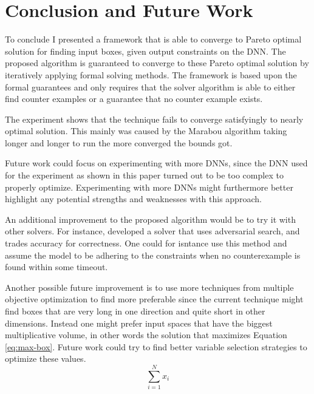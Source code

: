 \documentclass[../main.tex]{subfiles}
\begin{document}
\section{Conclusion and Future Work}\label{sec:Conclusion}
To conclude I presented a framework that is able to converge to Pareto optimal solution for finding input boxes, given output constraints on the DNN. The proposed algorithm is guaranteed to converge to these Pareto optimal solution by iteratively applying formal solving methods. The framework is based upon the formal guarantees and only requires that the solver algorithm is able to either find counter examples or a guarantee that no counter example exists.

The experiment shows that the technique fails to converge satisfyingly to nearly optimal solution. This mainly was caused by the Marabou algorithm taking longer and longer to run the more converged the bounds got. 

Future work could focus on experimenting with more DNNs, since the DNN used for the experiment as shown in this paper turned out to be too complex to properly optimize. Experimenting with more DNNs might furthermore better highlight any potential strengths and weaknesses with this approach.

An additional improvement to the proposed algorithm would be to try it with other solvers. For instance, \textcite{henriksenEfficientNeuralNetwork} developed a solver that uses adversarial search, and trades accuracy for correctness. One could for isntance use this method and assume the model to be adhering to the constraints when no counterexample is found within some timeout.

Another possible future improvement is to use more techniques from multiple objective optimization to find more preferable since the current technique might find boxes that are very long in one direction and quite short in other dimensions. Instead one might prefer input spaces that have the biggest multiplicative volume, in other words the solution that maximizes Equation \ref{eq:max-box}. Future work could try to find better variable selection strategies to optimize these values.
\begin{equation}\label{eq:max-box}
    \sum_{i=1}^N x_i
\end{equation}
\end{document}
